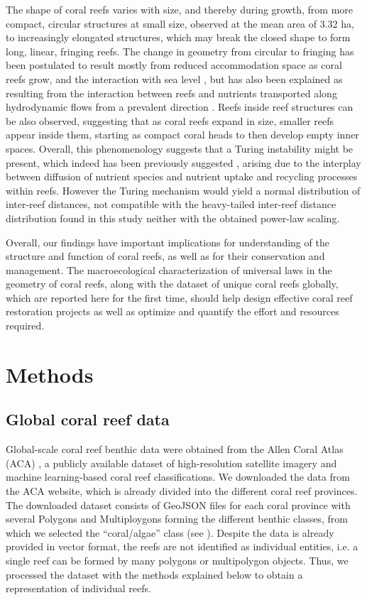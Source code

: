 The shape of coral reefs varies with size, and thereby during growth, from
more compact, circular structures at small size, observed at the mean area of
3.32 ha, to increasingly elongated structures, which may break the closed shape
to form long, linear, fringing reefs. The change in geometry from circular to
fringing has been postulated to result mostly from reduced accommodation space
as coral reefs grow, and the interaction with sea level \cite{Kennedy2002}, but
has also been explained as resulting from the interaction between reefs and
nutrients transported along hydrodynamic flows from a prevalent direction
\cite{Mistr2003}. Reefs inside reef structures can be also observed, suggesting
that as coral reefs expand in size, smaller reefs appear inside them, starting
as compact coral heads to then develop empty inner spaces. Overall, this
phenomenology suggests that a Turing instability
\cite{turing1952chemical,CrossGreensidebook} might be present, which indeed has
been previously suggested \cite{Mistr2003}, arising due to the interplay
between diffusion of nutrient species and nutrient uptake and recycling
processes within reefs. However the Turing mechanism would yield a normal
distribution of inter-reef distances, not compatible with the heavy-tailed
inter-reef distance distribution found in this study neither with the obtained
power-law scaling.

Overall, our findings have important implications for understanding of the
structure and function of coral reefs, as well as for their conservation and
management. The macroecological characterization of universal laws in the
geometry of coral reefs, along with the dataset of unique coral reefs globally,
which are reported here for the first time, should help design effective coral
reef restoration projects as well as optimize and quantify the effort and
resources required.

\section{Methods}

\subsection{Global coral reef data}

Global-scale coral reef benthic data were obtained from the Allen Coral
Atlas (ACA) \cite{allen-coral-atlas}, a publicly available dataset of
high-resolution satellite imagery and machine learning-based coral reef
classifications. We downloaded the data from the ACA website, which is already
divided into the different coral reef provinces. The downloaded dataset
consists of GeoJSON files for each coral province with several Polygons and
Multiploygons forming the different benthic classes, from which we selected the
``coral/algae'' class (see \cite{allen-coral-atlas}). Despite the data is
already provided in vector format, the reefs are not identified as individual
entities, i.e. a single reef can be formed by many polygons or multipolygon
objects. Thus, we processed the dataset with the methods explained below to
obtain a representation of individual reefs.


